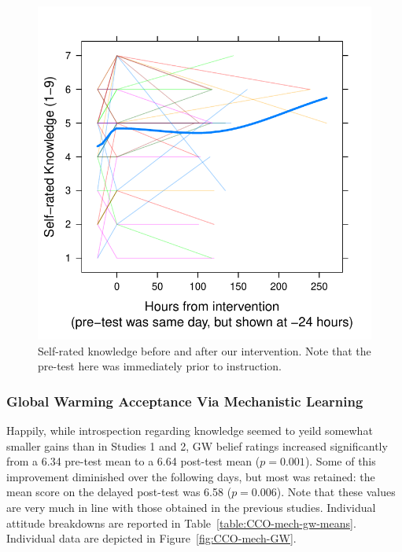 \begin{figure}
    \centering
    \includegraphics{CCO-mech-self.pdf}
    \caption{Self-rated knowledge before and after our intervention. Note that the
        pre-test here was immediately prior to instruction.}
    \label{fig:CCO-mech-self}
\end{figure}

\subsubsection{Global Warming Acceptance Via Mechanistic Learning}

Happily, while introspection regarding knowledge seemed to yeild somewhat
smaller gains than in Studies 1 and 2, GW belief ratings increased significantly
from a 6.34 pre-test mean to a 6.64 post-test mean ($p=0.001$). Some of this
improvement diminished over the following days, but most was retained: the mean
score on the delayed post-test was 6.58 ($p=0.006$). Note that these values are
very much in line with those obtained in the previous studies. Individual
attitude breakdowns are reported in Table~\ref{table:CCO-mech-gw-means}.
Individual data are depicted in Figure~\ref{fig:CCO-mech-GW}.


